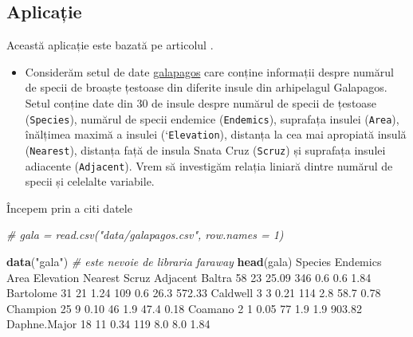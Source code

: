 \documentclass[]{article}
\newenvironment{Shaded}{\begin{snugshade}}{\end{snugshade}}
\newcommand{\KeywordTok}[1]{\textcolor[rgb]{0.13,0.29,0.53}{\textbf{#1}}}
\newcommand{\DecValTok}[1]{\textcolor[rgb]{0.00,0.00,0.81}{#1}}
\newcommand{\FloatTok}[1]{\textcolor[rgb]{0.00,0.00,0.81}{#1}}
\newcommand{\StringTok}[1]{\textcolor[rgb]{0.31,0.60,0.02}{#1}}
\newcommand{\CommentTok}[1]{\textcolor[rgb]{0.56,0.35,0.01}{\textit{#1}}}
\newcommand{\NormalTok}[1]{#1}
\newenvironment{frshaded*}{%
  \def\FrameCommand{\fboxrule=\FrameRule\fboxsep=\FrameSep \fcolorbox{framecolor}{shadecolor1}}%
  \MakeFramed {\advance\hsize-\width \FrameRestore}}%
{\endMakeFramed}
\newenvironment{rmdblock}[1]
  {\begin{frshaded*}
  \begin{itemize}
  \renewcommand{\labelitemi}{
    \raisebox{-.7\height}[0pt][0pt]{
      {\setkeys{Gin}{width=2em,keepaspectratio}\texttt{[image: images/icons/\#1]}}
    }
  }
  \item
  }
  {
  \end{itemize}
  \end{frshaded*}
  }
\newenvironment{rmdexercise}
  {\begin{rmdblock}{exercise}}
  {\end{rmdblock}}
\begin{document}
\subsection{Aplicație}\label{aplicatie-1}

Această aplicație este bazată pe articolul \citep{Johnson1973}.

\begin{rmdexercise}
Considerăm setul de date \href{dataIn/galapagos.csv}{galapagos} care
conține informații despre numărul de specii de broaște țestoase din
diferite insule din arhipelagul Galapagos. Setul conține date din 30 de
insule despre numărul de specii de țestoase (\texttt{Species}), numărul
de specii endemice (\texttt{Endemics}), suprafața insulei
(\texttt{Area}), înălțimea maximă a insulei (`\texttt{Elevation}),
distanța la cea mai apropiată insulă (\texttt{Nearest}), distanța față
de insula Snata Cruz (\texttt{Scruz}) și suprafața insulei adiacente
(\texttt{Adjacent}). Vrem să investigăm relația liniară dintre numărul
de specii și celelalte variabile.
\end{rmdexercise}

Începem prin a citi datele

\begin{Shaded}
\begin{Highlighting}[]
\CommentTok{# gala = read.csv("data/galapagos.csv", row.names = 1)}

\KeywordTok{data}\NormalTok{(}\StringTok{"gala"}\NormalTok{) }\CommentTok{# este nevoie de libraria faraway}
\KeywordTok{head}\NormalTok{(gala)}
\NormalTok{             Species Endemics  Area Elevation Nearest Scruz Adjacent}
\NormalTok{Baltra            }\DecValTok{58}       \DecValTok{23} \FloatTok{25.09}       \DecValTok{346}     \FloatTok{0.6}   \FloatTok{0.6}     \FloatTok{1.84}
\NormalTok{Bartolome         }\DecValTok{31}       \DecValTok{21}  \FloatTok{1.24}       \DecValTok{109}     \FloatTok{0.6}  \FloatTok{26.3}   \FloatTok{572.33}
\NormalTok{Caldwell           }\DecValTok{3}        \DecValTok{3}  \FloatTok{0.21}       \DecValTok{114}     \FloatTok{2.8}  \FloatTok{58.7}     \FloatTok{0.78}
\NormalTok{Champion          }\DecValTok{25}        \DecValTok{9}  \FloatTok{0.10}        \DecValTok{46}     \FloatTok{1.9}  \FloatTok{47.4}     \FloatTok{0.18}
\NormalTok{Coamano            }\DecValTok{2}        \DecValTok{1}  \FloatTok{0.05}        \DecValTok{77}     \FloatTok{1.9}   \FloatTok{1.9}   \FloatTok{903.82}
\NormalTok{Daphne.Major      }\DecValTok{18}       \DecValTok{11}  \FloatTok{0.34}       \DecValTok{119}     \FloatTok{8.0}   \FloatTok{8.0}     \FloatTok{1.84}
\end{Highlighting}
\end{Shaded}
\end{document}
